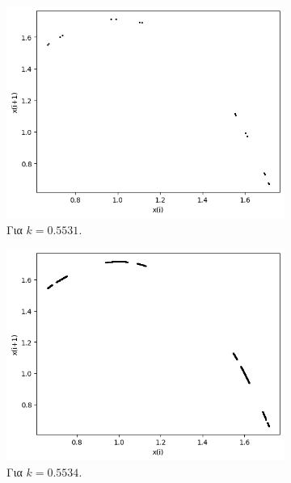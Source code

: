 \begin{figure}[h!]
	\begin{subfigure}[b]{0.4\textwidth}
		\centering
		\includegraphics[width=\textwidth]{LateX images/graphs q05/g7}
		\caption{Για $k=0.5531$.}
		\label{f:k31}
	\end{subfigure}
	\hfill
	\begin{subfigure}[b]{0.4\textwidth}
		\centering
		\includegraphics[width=\textwidth]{LateX images/graphs q05/g8}
		\caption{Για $k=0.5534$.}
		\label{f:k32}
	\end{subfigure}
	\hfill
	\begin{subfigure}[c]{0.4\textwidth}
		\centering

\end{subfigure}
\end{figure}
